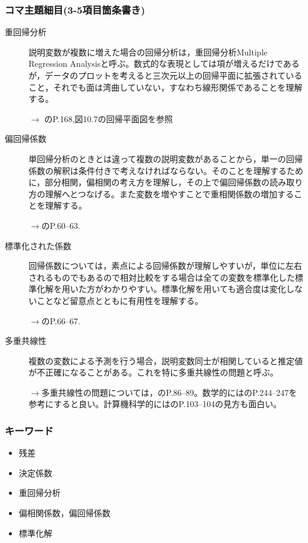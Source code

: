 \subsubsection{コマ主題細目(3-5項目箇条書き)}
\begin{description}


\item[重回帰分析]説明変数が複数に増えた場合の回帰分析は，重回帰分析Multiple Regression Analysisと呼ぶ。数式的な表現としては項が増えるだけであるが，データのプロットを考えると三次元以上の回帰平面に拡張されていること，それでも面は湾曲していない，すなわち線形関係であることを理解する。
\begin{flushright}
    $\to$ \citet{kosugi2019}のP.168,図10.7の回帰平面図を参照
\end{flushright}

\item[偏回帰係数]単回帰分析のときとは違って複数の説明変数があることから，単一の回帰係数の解釈は条件付きで考えなければならない。そのことを理解するために，部分相関，偏相関の考え方を理解し，その上で偏回帰係数の読み取り方の理解へとつなげる。また変数を増やすことで重相関係数の増加することを理解する。
\begin{flushright}
    $\to$\citet{kosugi2018}のP.60--63.
\end{flushright}

\item[標準化された係数]回帰係数については，素点による回帰係数が理解しやすいが，単位に左右されるものでもあるので相対比較をする場合は全ての変数を標準化した標準化解を用いた方がわかりやすい。標準化解を用いても適合度は変化しないことなど留意点とともに有用性を理解する。
\begin{flushright}
    $\to$\citet{kosugi2018}のP.66--67.
\end{flushright}


\item[多重共線性] 複数の変数による予測を行う場合，説明変数同士が相関していると推定値が不正確になることがある。これを特に多重共線性の問題と呼ぶ。
\begin{flushright}
    $\to$多重共線性の問題については，\citet{清水201705}のP.86--89。数学的には\citet{南風原200206}のP.244--247を参考にすると良い。計算機科学的には\citet{松浦201610}のP.103--104の見方も面白い。
\end{flushright}


\end{description}
\subsubsection{キーワード}
\begin{itemize}
\item 残差
\item 決定係数
\item 重回帰分析
\item 偏相関係数，偏回帰係数
\item 標準化解
\end{itemize}
